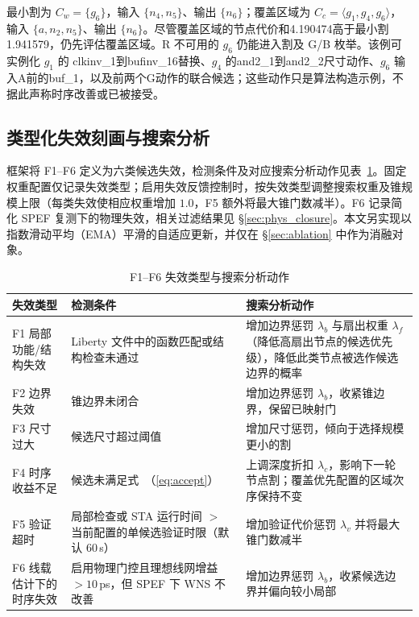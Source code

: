 \documentclass[twocolumn,10pt,fontset=windows]{ctexart}
\renewcommand{\eqref}[1]{\textup{（\ref{#1}）}}
\begin{document}
最小割为 $C_w=\{g_6\}$，输入 $\{n_4,n_5\}$、输出 $\{n_6\}$；覆盖区域为 $C_c=\langle g_1,g_4,g_6\rangle$，输入 $\{a,n_2,n_5\}$、输出 $\{n_6\}$。尽管覆盖区域的节点代价和4.190474高于最小割1.941579，仍先评估覆盖区域。R 不可用的 $g_6$ 仍能进入割及 G/B 枚举。该例可实例化 $g_1$ 的 clkinv\_1到bufinv\_16替换、$g_4$ 的and2\_1到and2\_2尺寸动作、$g_6$ 输入A前的buf\_1，以及前两个G动作的联合候选；这些动作只是算法构造示例，不据此声称时序改善或已被接受。

\subsection{类型化失效刻画与搜索分析}\label{sec:failure_char}


框架将 F1--F6 定义为六类候选失效，检测条件及对应搜索分析动作见表~\ref{tab:failures}。固定权重配置仅记录失效类型；启用失效反馈控制时，按失效类型调整搜索权重及锥规模上限（每类失效使相应权重增加 $1.0$，F5 额外将最大锥门数减半）。F6 记录简化 SPEF 复测下的物理失效，相关过滤结果见 \S\ref{sec:phys_closure}。本文另实现以指数滑动平均（EMA）平滑的自适应更新，并仅在 \S\ref{sec:ablation} 中作为消融对象。

\begin{table}[!htbp]
\centering
\caption{F1--F6 失效类型与搜索分析动作}
\label{tab:failures}
\scriptsize
\setlength{\tabcolsep}{2pt}
\begin{tabular}{p{2.0cm}p{2.6cm}p{2.9cm}}
\toprule
\textbf{失效类型} & \textbf{检测条件} & \textbf{搜索分析动作} \\
\midrule
F1 局部功能/结构失效 & Liberty 文件中的函数匹配或结构检查未通过 & 增加边界惩罚 $\lambda_b$ 与扇出权重 $\lambda_f$（降低高扇出节点的候选优先级），降低此类节点被选作候选边界的概率 \\
F2 边界失效 & 锥边界未闭合 & 增加边界惩罚 $\lambda_b$，收紧锥边界，保留已映射门 \\
F3 尺寸过大 & 候选尺寸超过阈值 & 增加尺寸惩罚，倾向于选择规模更小的割 \\
F4 时序收益不足 & 候选未满足式~\eqref{eq:accept} & 上调深度折扣 $\lambda_c$，影响下一轮节点割；覆盖优先配置的区域次序保持不变 \\
F5 验证超时 & 局部检查或 STA 运行时间 $>$ 当前配置的单候选验证时限（默认 $60\,$s） & 增加验证代价惩罚 $\lambda_v$ 并将最大锥门数减半 \\
F6 线载估计下的时序失效 & 启用物理门控且理想线网增益 $>10\,$ps，但 SPEF 下 WNS 不改善 & 增加边界惩罚 $\lambda_b$，收紧候选边界并偏向较小局部 \\
\bottomrule
\end{tabular}
\end{table}
\end{document}

